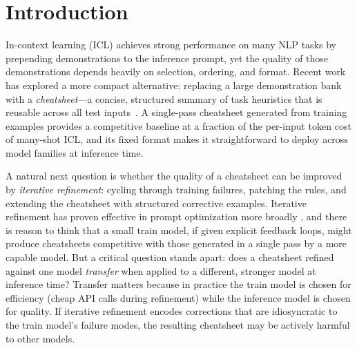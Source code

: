 %


\section{Introduction}
\label{sec:intro}

In-context learning (ICL) achieves strong performance on many NLP tasks by prepending
demonstrations to the inference prompt, yet the quality of those demonstrations depends
heavily on selection, ordering, and format.
Recent work has explored a more compact alternative: replacing a large demonstration bank
with a \emph{cheatsheet}---a concise, structured summary of task heuristics that is
reusable across all test inputs~\citep{csicl2024}.
A single-pass cheatsheet generated from training examples provides a competitive baseline
at a fraction of the per-input token cost of many-shot ICL, and its fixed format makes it
straightforward to deploy across model families at inference time.

A natural next question is whether the quality of a cheatsheet can be improved by
\emph{iterative refinement}: cycling through training failures, patching the rules, and
extending the cheatsheet with structured corrective examples.
Iterative refinement has proven effective in prompt optimization more broadly
\citep{opro2023,ape2022,zhou2022large}, and there is reason to think that a small train
model, if given explicit feedback loops, might produce cheatsheets competitive with those
generated in a single pass by a more capable model.
But a critical question stands apart: does a cheatsheet refined against one model
\emph{transfer} when applied to a different, stronger model at inference time?
Transfer matters because in practice the train model is chosen for efficiency
(cheap API calls during refinement) while the inference model is chosen for quality.
If iterative refinement encodes corrections that are idiosyncratic to the train model's
failure modes, the resulting cheatsheet may be actively harmful to other models.

